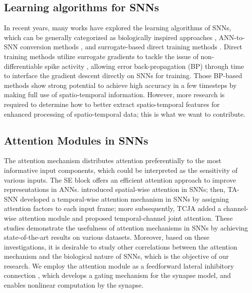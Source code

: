 \documentclass[letterpaper]{article} \usepackage[submission]{aaai23}  \usepackage{times}  \usepackage{helvet}  \usepackage{courier}  \usepackage[hyphens]{url}  \usepackage{graphicx} \urlstyle{rm} \def\UrlFont{\rm}  \usepackage{natbib}  \usepackage{caption} \frenchspacing  \setlength{\pdfpagewidth}{8.5in} \setlength{\pdfpageheight}{11in} \usepackage{algorithm}
\begin{document}
\subsection{Learning algorithms for SNNs}
In recent years, many works have explored the learning algorithms of SNNs, which can be generally categorized as biologically inspired approaches \cite{diehl_unsupervised_2015,bellec_solution_2020,zhang_spike-train_2019}, ANN-to-SNN conversion methods \cite{orchard_converting_2015,sengupta_going_2019,han_rmp-snn_2020}, and surrogate-based direct training methods \cite{wu_spatio-temporal_2018,neftci_surrogate_2019,fang_incorporating_2021}.
Direct training methods utilize surrogate gradients to tackle the issue of non-differentiable spike activity \cite{wu_spatio-temporal_2018}, allowing error back-propagation (BP) through time to interface the gradient descent directly on SNNs for training. Those BP-based methods show strong potential to achieve high accuracy in a few timesteps by making full use of spatio-temporal information\cite{wu_direct_2019,fang_incorporating_2021}. 
However, more research is required to determine how to better extract spatio-temporal features for enhanced processing of spatio-temporal data; this is what we want to contribute.

\subsection{Attention Modules in SNNs}
The attention mechanism distributes attention preferentially to the most informative input components, which could be interpreted as the sensitivity of various inputs. The SE block \cite{hu_squeeze-and-excitation_2018} offers an efficient attention approach to improve representations in ANNs. \cite{xie_efficient_2017,kundu_spike-thrift_2021} introduced spatial-wise attention in SNNs; then, TA-SNN \cite{yao_temporal-wise_2021} developed a temporal-wise attention mechanism in SNNs by assigning attention factors to each input frame; more subsequently, TCJA \cite{zhu_tcja-snn_2022} added a channel-wise attention module
and proposed temporal-channel joint attention. 
These studies demonstrate the usefulness of attention mechanisms in SNNs by achieving state-of-the-art results on various datasets. 
Moreover, based on these investigations, it is desirable to study other correlations between the attention mechanism and the biological nature of SNNs, which is the objective of our research. We employ the attention module as a feedforward lateral inhibitory connection \cite{luo_architectures_nodate}, which develops a gating mechanism for the synapse model, and enables nonlinear computation by the synapse.
\end{document}
